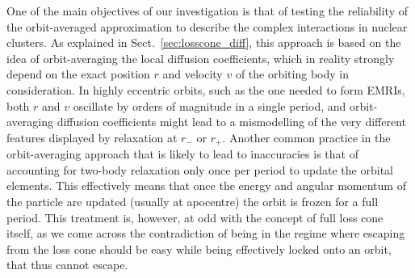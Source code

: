 \documentclass[desactivate]{aa}
\begin{document}
        One of the main objectives of our investigation is that of testing the reliability of the orbit-averaged approximation to describe the complex interactions in nuclear clusters. As explained in Sect.\ \ref{sec:losscone_diff}, this approach is based on the idea of orbit-averaging the local diffusion coefficients, which in reality strongly depend on the exact position $r$ and velocity $v$ of the orbiting body in consideration. In highly eccentric orbits, such as the one needed to form EMRIs, both $r$ and $v$ oscillate by orders of magnitude in a single period, and orbit-averaging diffusion coefficients might lead to a mismodelling of the very different features displayed by relaxation at $r_-$ or $r_+$. Another common practice in the orbit-averaging approach that is likely to lead to inaccuracies is that of accounting for two-body relaxation only once per period to update the orbital elements. This effectively means that once the energy and angular momentum of the particle are updated (usually at apocentre) the orbit is frozen for a full period. This treatment is, however, at odd with the concept of full loss cone itself, as we come across the contradiction of being in the regime where escaping from the loss cone should be easy while being effectively locked onto an orbit, that thus cannot escape.
\end{document}
